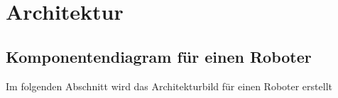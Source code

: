 %
%
\chapter{Architektur} \label{Kap:4}



\section{Komponentendiagram für einen Roboter}
Im folgenden Abschnitt wird das Architekturbild für einen Roboter erstellt
\newpage
